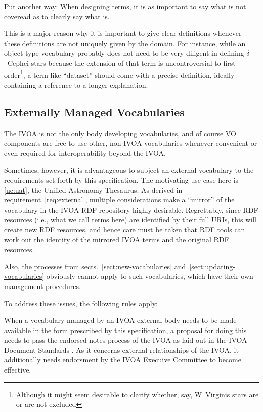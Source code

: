 \documentclass[11pt,a4paper]{ivoa}
\begin{document}
Put another way: When designing terms, it is as important to say what is
not coveread as to clearly say what is.

This is a major reason why it is important to give clear definitions
whenever these definitions are not uniquely given by the domain.  For
instance, while an object type vocabulary probably does not need to be
very diligent in defining $\delta$~Cephei stars because the extension of
that term is uncontroversial to first order\footnote{Although it might
seem desirable to clarify whether, say, W~Virginis stars are or are not
excluded}, a term like ``dataset'' should come with a precise
definition, ideally containing a reference to a longer explanation.

\subsection{Externally Managed Vocabularies}
\label{sect:externally-managed}

The IVOA is not the only body developing vocabularies, and of course VO
components are free to use other, non-IVOA vocabularies whenever
convenient or even required for interoperability beyond the IVOA.

Sometimes, however, it is advantageous to subject an external vocabulary
to the requirements set forth by this specification.  The motivating use
case here is \ref{uc:uat}, the Unified Astronomy Thesaurus.  As derived
in requirement~\ref{req:external}, multiple considerations make a
``mirror'' of the vocabulary in the IVOA RDF repository highly
desirable.  Regrettably, since RDF resources (i.e., what we call terms
here) are identified by their full URIs, this will create new RDF
resources, and hence care must be taken that RDF tools can work out the
identity of the mirrored IVOA terms and the original RDF resources.

Also, the processes from sects.~\ref{sect:new-vocabularies}
and~\ref{sect:updating-vocabularies} obviously cannot apply to such
vocabularies, which have their own management procedures.

To address these issues, the following rules apply:

When a vocabulary managed by an IVOA-external body needs to be made
available in the form prescribed by this specification, a proposal for
doing this needs to pass the endorsed notes process of the IVOA as laid
out in the IVOA Document Standards \citep{2017ivoa.spec.0517G}.  As it
concerns external relationships of the IVOA, it additionally needs
endorsment by the IVOA Execuive Committee to become effective.
\end{document}
